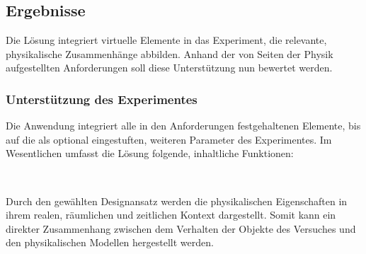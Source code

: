 \subsection{Ergebnisse}
 Die Lösung integriert virtuelle Elemente in das Experiment, die relevante, physikalische Zusammenhänge abbilden. Anhand der von Seiten der Physik aufgestellten Anforderungen soll diese Unterstützung nun bewertet werden.

\subsubsection{Unterstützung des Experimentes}
Die Anwendung integriert alle in den Anforderungen festgehaltenen Elemente, bis auf die als optional eingestuften, weiteren Parameter des Experimentes. Im Wesentlichen umfasst die Lösung folgende, inhaltliche Funktionen:
\vspace{8px}
\begin{center}
	\\
\end{center}
\vspace{6px}

Durch den gewählten Designansatz werden die physikalischen Eigenschaften in ihrem realen, räumlichen und zeitlichen Kontext dargestellt. Somit kann ein direkter Zusammenhang zwischen dem Verhalten der Objekte des Versuches und den physikalischen Modellen hergestellt werden.\\

